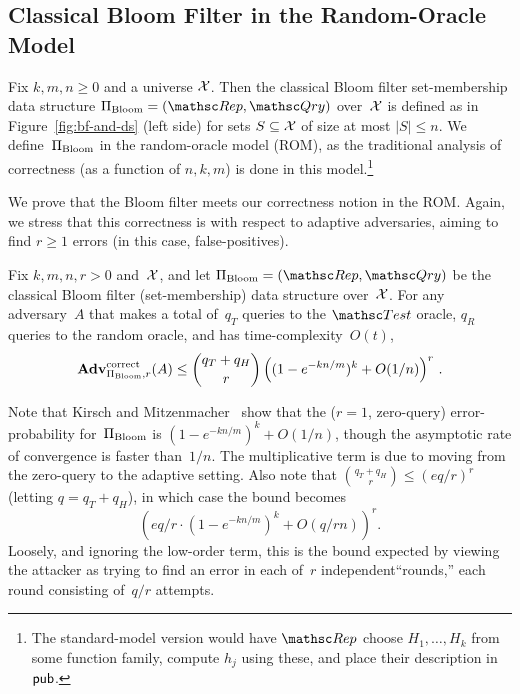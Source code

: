 \subsection{Classical Bloom Filter in the Random-Oracle Model}
Fix $k,m,n \geq 0$ and a universe ${\cal X}$.  Then the classical Bloom
filter set-membership data structure $\setprim_{\mathrm{Bloom}}=
(\Rep, \Qry)$ over~${\cal X}$ is defined as in
Figure~\ref{fig:bf-and-ds} (left side) for sets $S \subseteq {\cal X}$
of size at most $|S|\leq n$.  We
define~$\Pi_{\mathrm{Bloom}}$ in the random-oracle model (ROM),
as the traditional analysis of correctness (as a function of
$n,k,m$) is done in this model.\footnote{The standard-model version
would have $\Rep$ choose $H_1,\ldots,H_k$ from some function family,
compute $h_j$ using these, and place their description in
${\sf pub}$.}

 We prove that the Bloom filter meets our
correctness notion in the ROM.  Again, we stress that this
correctness is with respect to adaptive adversaries, aiming to find
$r \geq 1$ errors (in this case, false-positives).


\begin{theorem}\label{thm3}\label{thm:bf-correctness}
Fix $k,m,n,r>0$ and~${\cal X}$, and let $\setprim_{\mathrm{Bloom}}=
(\Rep, \Qry)$ be the classical Bloom filter (set-membership) data
structure over~${\cal X}$. For any adversary~$A$ that makes a total
of~$q_T$ queries to the $\Test$ oracle, $q_R$ queries to the random
oracle, and has time-complexity~$O(t)$,
\[
\mathrm{\mathbf{Adv}}^{\mathrm{correct}}_{\Pi_{\mathrm{Bloom}},r}(A) \leq  {\dbinom{q_T + q_H}{r}} \left( (1-e^{-kn/m})^k + O(1/n) \right)^r\,.
\]
\end{theorem}
Note that Kirsch and Mitzenmacher~\cite{kirsch2006less} show that
the ($r=1$, zero-query) error-probability
for~$\Pi_\mathrm{Bloom}$ is %
$(1-e^{-kn/m})^k+O(1/n)$, though the asymptotic rate of convergence
is faster than~$1/n$.
The multiplicative %
term is due to moving from the zero-query to the adaptive setting.
Also note that $\binom{q_T+q_H}{r} \leq (eq/r)^r$ (letting
$q=q_T+q_H$), in which case the bound becomes
\[\left(eq/r \cdot (1-e^{-kn/m})^k + O(q/rn) \right)^r.\]
Loosely, and ignoring the low-order term, this is the bound expected
by viewing the attacker as trying to find an error in each of~$r$
independent``rounds,'' each round consisting of~$q/r$ attempts.


